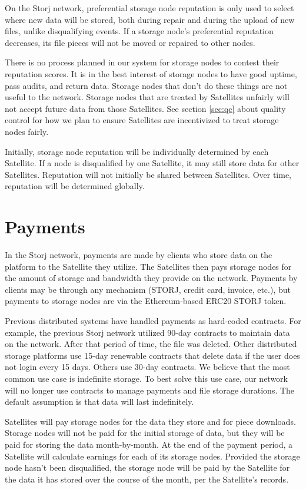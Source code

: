 \documentclass[8pt,fleqn,openany]{book}
\begin{document}
On the Storj network, preferential storage node reputation is only used to
select where new data will be stored, both during repair and during the
upload of new files, unlike disqualifying events.
If a storage node's preferential reputation decreases, its file pieces will not
be moved or repaired to other nodes.

There is no process planned in our system for storage nodes to contest their
reputation scores. It is in the best interest of storage nodes to have good
uptime, pass audits, and return data. Storage nodes that don't do these things
are not useful to the network. Storage nodes that are treated by Satellites
unfairly will not accept future data from those Satellites. See section
\ref{sec:qc} about quality control for how we plan to ensure Satellites are
incentivized to treat storage nodes fairly.

Initially, storage node reputation will be individually determined by each
Satellite. If a node is disqualified by one Satellite, it may still
store data for other Satellites. Reputation will not initially be shared between
Satellites. Over time, reputation will be determined globally.

\section{Payments}\label{sec:concrete-payments}

In the Storj network, payments are made by clients who store data on the
platform to the Satellite they utilize.
The Satellites then pays storage nodes for the amount of storage and bandwidth
they provide on the network.
Payments by clients may be through any mechanism (STORJ, credit card, invoice,
etc.),
but payments to storage nodes are via the Ethereum-based ERC20 \cite{erc20} STORJ
token.

Previous distributed systems have handled payments as hard-coded contracts.
For example, the previous Storj network utilized 90-day contracts to maintain
data on the network. After that period of time, the file was deleted.
Other distributed storage platforms use 15-day renewable contracts that delete
data if the user does not login every 15 days. Others use 30-day contracts.
We believe that the most common use case is indefinite storage. To best solve
this use case, our network will no longer use contracts to manage payments
and file storage durations. The default assumption is that data will last
indefinitely.

Satellites will pay storage nodes for the data they store
and for piece downloads.
Storage nodes will not be paid for the initial storage of data, but they
will be paid for storing the data month-by-month. At the end of the payment
period, a Satellite will calculate earnings for each of its storage nodes.
Provided the storage node hasn't been disqualified,
the storage node will be paid by the Satellite for the data it has stored
over the course of
the month, per the Satellite's records.
\end{document}
